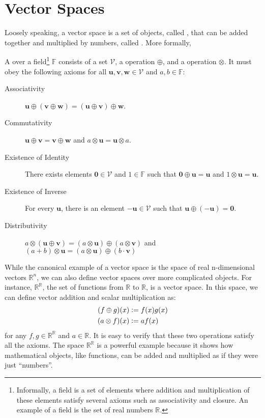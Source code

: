 \section{Vector Spaces}
Loosely speaking, a vector space is a set of objects, called , that can be added together and multiplied by numbers, called . More formally,
%
\begin{definition}
A  over a field\footnote{Informally, a field is a set of elements where addition and multiplication of these elements satisfy several axioms such as associativity and closure. An example of a field is the set of real numbers $\mathbb{R}$.} $\mathbb{F}$ consists of a set $\mathcal{V}$, a  operation $\oplus$, and a  operation $\otimes$. It must obey the following axioms for all $\mathbf{u}, \mathbf{v}, \mathbf{w} \in \mathcal{V}$ and $a, b \in \mathbb{F}$:
%
\begin{description}
  \item[Associativity] $\mathbf{u} \oplus (\mathbf{v} \oplus \mathbf{w}) = (\mathbf{u} \oplus \mathbf{v}) \oplus \mathbf{w}$.
  \item[Commutativity] $\mathbf{u} \oplus \mathbf{v} = \mathbf{v} \oplus \mathbf{w}$ and $a \otimes \mathbf{u} = \mathbf{u} \otimes a$.
  \item[Existence of Identity] There exists elements $\mathbf{0} \in \mathcal{V}$ and $1 \in \mathbb{F}$ such that $\mathbf{0} \oplus \mathbf{u} = \mathbf{u}$ and $1 \otimes \mathbf{u} = \mathbf{u}$.
  \item[Existence of Inverse] For every $\mathbf{u}$, there is an element $-\mathbf{u} \in \mathcal{V}$ such that $\mathbf{u} \oplus (-\mathbf{u}) = \mathbf{0}$.
  \item[Distributivity] $a \otimes (\mathbf{u} \oplus \mathbf{v}) = (a \otimes \mathbf{u}) \oplus (a \otimes \mathbf{v})$ and $(a + b) \otimes \mathbf{u} = (a \otimes \mathbf{u}) \oplus (b \cdot \mathbf{v})$
\end{description}
\end{definition}
%
While the canonical example of a vector space is the space of real n-dimensional vectors $\mathbb{R}^n$, we can also define vector spaces over more complicated objects. For instance, $\mathbb{R}^\mathbb{R}$, the set of functions from $\mathbb{R}$ to $\mathbb{R}$, is a vector space. In this space, we can define vector addition and scalar multiplication as:
%
\begin{align}
  (f \oplus g)(x) &\vcentcolon= f(x) g(x) \\
  (a \otimes f)(x) &\vcentcolon= a f(x)
\end{align}
%
for any $f, g \in \mathbb{R}^\mathbb{R}$ and $a \in \mathbb{R}$. It is easy to verify that these two operations satisfy all the axioms. The space $\mathbb{R}^\mathbb{R}$ is a powerful example because it shows how mathematical objects, like functions, can be added and multiplied as if they were just ``numbers''.

